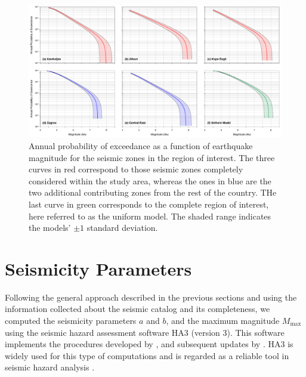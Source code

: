 
\begin{figure}[t]
    \centering
    \includegraphics[width=\textwidth]{figures/pdf/figure-06} 
    \caption{Annual probability of exceedance as a function of earthquake magnitude for the seismic zones in the region of interest. The three curves in red correspond to those seismic zones completely considered within the study area, whereas the ones in blue are the two additional contributing zones from the rest of the country. THe last curve in green corresponds to the complete region of interest, here referred to as the uniform model. The shaded range indicates the models' $\pm 1$ standard deviation.}
    \label{fig:annualp}
\end{figure}

\section{Seismicity Parameters}

Following the general approach described in the previous sections and using the information collected about the seismic catalog and its completeness, we computed the seismicity parameters $a$ and $b$, and the maximum magnitude $M_{\max}$ using the seismic hazard assessment software HA3 (version 3). This software implements the procedures developed by \citet{Kijko_1989_BSSA, Kijko_1992_BSSA}, and subsequent updates by \citet{Kijko_2004_PAG}. HA3 is widely used for this type of computations and is regarded as a reliable tool in seismic hazard analysis \citep[see, for instance,][]{Karimiparidari2013, Khodaverdian_2016_BSSA}.

